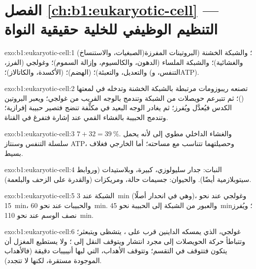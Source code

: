 \section*{الفصل \ref{ch:b1:eukaryotic-cell} --- التنظيم الوظيفي للخلية حقيقية النواة}

\begin{solution}{exo:b1:eukaryotic-cell:1}
 (الصبغيات، والاستنساخ)؛ والشبكة الخشنة (البروتينات المفرزة
والغشائية)؛ والشبكة الملساء (الدهون، والكالسيوم، وإزالة السموم)؛
وغولجي (الفرز، والتعديل، والتعبئة)؛  (الهضم)؛
 (الأكسدة، والكاتالاز)؛  (التنفس، وATP).
\end{solution}

\begin{solution}{exo:b1:eukaryotic-cell:2}
تصنعه ريبوزومات مرتبطة بالشبكة الخشنة وتدخله في لمعتها ()؛ ثم تتبرعم حويصلات من الشبكة وتندمج بالوجه القريب من غولجي؛
ويعبر البروتين الكدس فيُعدَّل ويُفرز؛ ثم يغادر الوجه البعيد في 
مكثِّفة تنضج فتصير حبيبة إفرازية؛ وتندمج الحبيبة بالغشاء القمي عند
إشارة فتفرغ في القناة.
\end{solution}

\begin{solution}{exo:b1:eukaryotic-cell:3}
$7 + 32 = \qty{39}{\%}$. والغشاء الداخلي مطوي إلى  لأنه يحمل
سلسلة التنفس وسنتاز ATP، وحصيلتهما تتناسب مع مساحته؛ أما الخارجي
فغلاف بسيط.
\end{solution}

\begin{solution}{exo:b1:eukaryotic-cell:4}
النبات: جدار سليولوزي،  كبيرة، وبلاستيدات (وروابط سيتوبلازمية
أيضًا). والحيوان: جسيمات حالة، ومريكزات (والقدرة على الزحف
والبلعمة).
\end{solution}

\begin{solution}{exo:b1:eukaryotic-cell:5}
الشبكة عند \qty{3}{min} (وهي في انحدار أصلًا)، وغولجي عند نحو
\qty{15}{min}، والحبيبات عند نحو \qty{60}{min}. والعبور من الشبكة
إلى الحبيبة نحو \qty{45}{min}؛ ويُفرز نصف الوسم عند نحو
\qty{110}{min}.
\end{solution}

\begin{solution}{exo:b1:eukaryotic-cell:6}
غولجي، الذي يمسكه الداينين قرب  على ، يتشظى ويتبعثر؛ وتتباطأ حركة الحويصلات إلى مجرد انتشار
ويتوقف النقل إلى ؛ ولا يستطيع المغزل أن يتكون فتتوقف  في
التقسم؛ وتتوقف الأهداب، التي لبها أنيبيبات دقيقة (فالأهداب الموجودة
مستقرة، لكنها لا تتجدد).
\end{solution}

